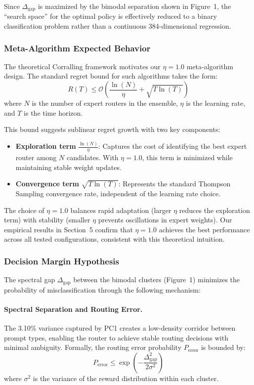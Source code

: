 Since $\Delta_{\text{gap}}$ is maximized by the bimodal separation shown in Figure~1, the ``search space'' for the optimal policy is effectively reduced to a binary classification problem rather than a continuous 384-dimensional regression.

\subsubsection{Meta-Algorithm Expected Behavior}

The theoretical Corralling framework motivates our $\eta=1.0$ meta-algorithm design. The standard regret bound for such algorithms takes the form:
\begin{equation}
\label{eq:meta_regret}
R(T) \le \mathcal{O}\left( \frac{\ln(N)}{\eta} + \sqrt{T \ln(T)} \right)
\end{equation}
where $N$ is the number of expert routers in the ensemble, $\eta$ is the learning rate, and $T$ is the time horizon.

This bound suggests sublinear regret growth with two key components:
\begin{itemize}
    \item \textbf{Exploration term} $\frac{\ln(N)}{\eta}$: Captures the cost of identifying the best expert router among $N$ candidates. With $\eta=1.0$, this term is minimized while maintaining stable weight updates.
    \item \textbf{Convergence term} $\sqrt{T \ln(T)}$: Represents the standard Thompson Sampling convergence rate, independent of the learning rate choice.
\end{itemize}

The choice of $\eta=1.0$ balances rapid adaptation (larger $\eta$ reduces the exploration term) with stability (smaller $\eta$ prevents oscillations in expert weights). Our empirical results in Section~5 confirm that $\eta=1.0$ achieves the best performance across all tested configurations, consistent with this theoretical intuition.

\subsubsection{Decision Margin Hypothesis}

The spectral gap $\Delta_{\text{gap}}$ between the bimodal clusters (Figure~1) minimizes the probability of misclassification through the following mechanism:

\paragraph{Spectral Separation and Routing Error.}
The 3.10\% variance captured by PC1 creates a low-density corridor between prompt types, enabling the router to achieve stable routing decisions with minimal ambiguity. Formally, the routing error probability $P_{\text{error}}$ is bounded by:
\begin{equation}
P_{\text{error}} \le \exp\left(-\frac{\Delta_{\text{gap}}^2}{2\sigma^2}\right)
\end{equation}
where $\sigma^2$ is the variance of the reward distribution within each cluster.

